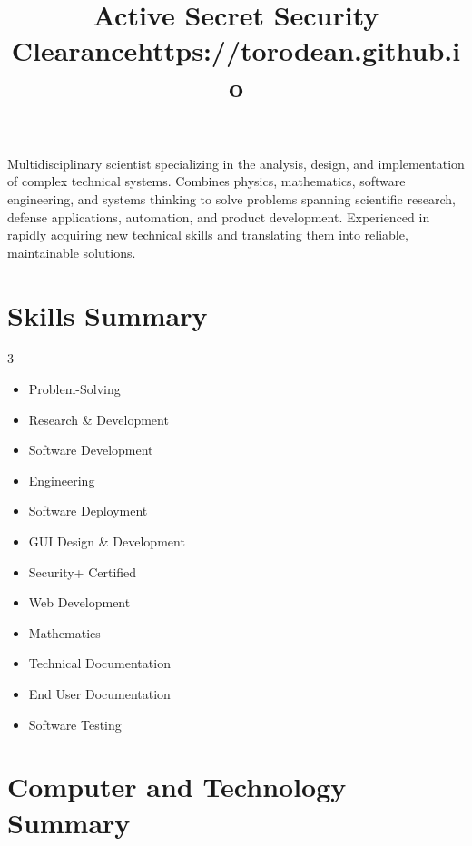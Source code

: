 \documentclass[11pt,a4paper,sans]{moderncv} %
\title{Active Secret Security Clearance\newline\newline https://torodean.github.io}
\begin{document}
\makecvtitle %


Multidisciplinary scientist specializing in the analysis, design, and implementation of complex technical systems. Combines physics, mathematics, software engineering, and systems thinking to solve problems spanning scientific research, defense applications, automation, and product development. Experienced in rapidly acquiring new technical skills and translating them into reliable, maintainable solutions.


\section{Skills Summary}

\begin{multicols}{3}
	\begin{itemize}
	\item Problem-Solving
	\item Research \& Development
	\item Software Development
	\item Engineering
	\item Software Deployment
	\item GUI Design \& Development
	\item Security+ Certified
	\item Web Development
	\item Mathematics
	\item Technical Documentation
	\item End User Documentation
	\item Software Testing
	\end{itemize}
\end{multicols}


\section{Computer and Technology Summary}
\end{document}
